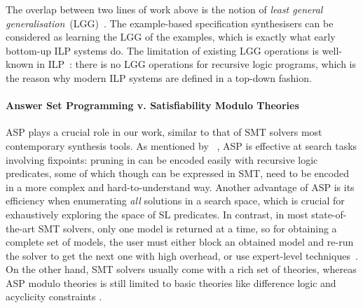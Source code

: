 The overlap between two lines of work above is the notion of
\emph{least general generalisation}~(LGG)~\cite{plotkin1970note}. The
example-based specification synthesisers can be considered as learning
the LGG of the examples, which is exactly what early bottom-up ILP
systems do. The limitation of existing LGG operations is well-known in
ILP~\cite{CropperD22}: there is no LGG operations for recursive logic
programs, which is the reason why modern ILP systems are defined in a
top-down fashion.

\paragraph{Answer Set Programming v. Satisfiability Modulo Theories}

ASP plays a crucial role in our work, similar to that of SMT solvers
most contemporary synthesis tools. 
%
As mentioned by \citeauthor{bembenek2023smt}~\cite{bembenek2023smt},
ASP is effective at search tasks involving fixpoints: pruning in \tool
can be encoded easily with recursive logic predicates, some of which
though can be expressed in SMT, need to be encoded in a more complex
and hard-to-understand way.
%
Another advantage of ASP is its efficiency when enumerating \emph{all}
solutions in a search space, which is crucial for exhaustively exploring
the space of SL predicates. 
%
In contrast, in most state-of-the-art SMT solvers, only one model is
returned at a time, so for obtaining a complete set of models, the
user must either block an obtained model and re-run the solver to get
the next one with high overhead, or use expert-level
techniques~\cite{bjorner2022user}.
%
On the other hand, SMT solvers usually come with a rich set of
theories, whereas ASP modulo theories is still limited to basic
theories like difference logic
\cite{DBLP:journals/tplp/JanhunenKOSWS17,DBLP:journals/algorithms/RajaratnamSWCLS23}
and acyclicity constraints \cite{DBLP:conf/lpnmr/BomansonGJKS15}.